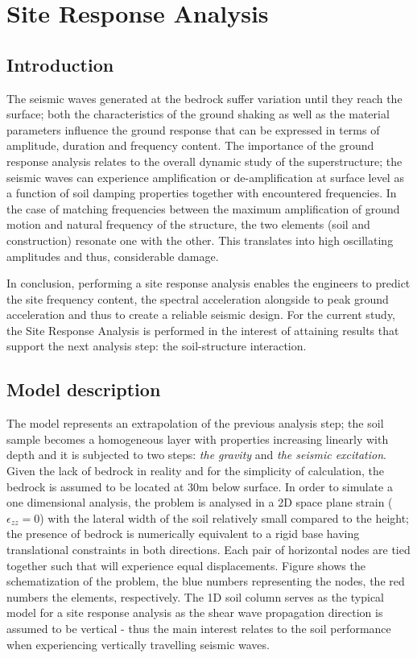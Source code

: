 	\chapter {Site Response Analysis}
	\section{Introduction}
	The seismic waves generated at the bedrock suffer variation until they reach the surface; both the characteristics of the ground shaking as well as the material parameters influence the ground response that can be expressed in terms of amplitude, duration and frequency content. The importance of the ground response analysis relates to the overall dynamic study of the superstructure; the seismic waves can experience amplification or de-amplification at surface level as a function of soil damping properties together with encountered frequencies. In the case of matching frequencies between the maximum amplification of ground motion and natural frequency of the structure, the two elements (soil and construction) resonate one with the other. This translates into high \mbox{oscillating} amplitudes and thus, considerable damage. 
	
	In conclusion, performing a site response analysis enables the engineers to predict the site frequency content, the spectral acceleration alongside to peak ground acceleration and thus to create a reliable seismic design. For the current study, the Site Response Analysis is performed in the interest of attaining results that support the next analysis step: the soil-structure interaction.
	
	
	\section{Model description}
	The model represents an extrapolation of the previous analysis step; the soil sample becomes a homogeneous layer with properties increasing linearly with depth and it is subjected to two steps: \textit{the gravity} and \textit{the seismic excitation}. Given the lack of bedrock in reality and for the simplicity of calculation, the bedrock is assumed to be located at 30m below surface. In order to simulate a one dimensional analysis, the problem is analysed in a 2D space plane strain ($\epsilon_{zz}=0$) with the lateral width of the soil relatively small compared to the height; the presence of bedrock is numerically equivalent to a rigid base having translational constraints in both directions. Each pair of horizontal nodes are tied together such that will experience equal displacements. Figure \label{fig:Soilcolumn} shows the schematization of the problem, the blue numbers representing the nodes, the red numbers the elements, respectively. The 1D soil column serves as the typical model for a site response analysis as the shear wave propagation direction is assumed to be vertical - thus the main interest relates to the soil performance when experiencing vertically travelling seismic waves.
	
